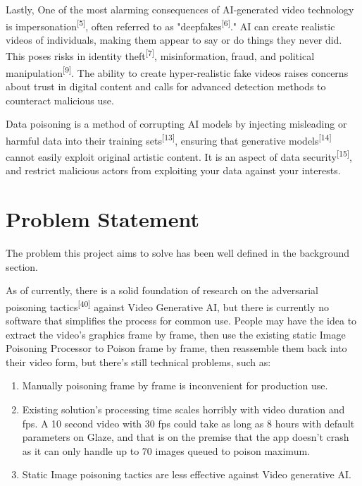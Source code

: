 Lastly, One of the most alarming consequences of AI-generated video technology is impersonation\textsuperscript{[5]}, often referred to as "deepfakes\textsuperscript{[6]}." AI can create realistic videos of individuals, making them appear to say or do things they never did. This poses risks in identity theft\textsuperscript{[7]}, misinformation, fraud, and political manipulation\textsuperscript{[9]}. The ability to create hyper-realistic fake videos raises concerns about trust in digital content and calls for advanced detection methods to counteract malicious use.

Data poisoning is a method of corrupting AI models by injecting misleading or harmful data into their training sets\textsuperscript{[13]}, ensuring that generative models\textsuperscript{[14]} cannot easily exploit original artistic content. It is an aspect of data security\textsuperscript{[15]}, and restrict malicious actors from exploiting your data against your interests.

\section{Problem Statement}
\label{section:problem-statement}
The problem this project aims to solve has been well defined in the background section. \newline

As of currently, there is a solid foundation of research on the adversarial poisoning tactics\textsuperscript{[40]} against Video Generative AI, but there is currently no software that simplifies the process for common use. People may have the idea to extract the video’s graphics frame by frame, then use the existing static Image Poisoning Processor to Poison frame by frame, then reassemble them back into their video form, but there’s still technical problems, such as:

\begin{enumerate}
        \item Manually poisoning frame by frame is inconvenient for production use.
        \item Existing solution’s processing time scales horribly with video duration and fps. A 10 second video with 30 fps could take as long as 8 hours with default parameters on Glaze, and that is on the premise that the app doesn’t crash as it can only handle up to 70 images queued to poison maximum.
        \item Static Image poisoning tactics are less effective against Video generative AI.
\end{enumerate}

